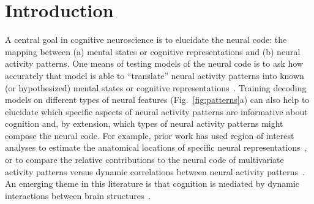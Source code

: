 \documentclass[english]{article}
\begin{document}
\section*{Introduction}
A central goal in cognitive neuroscience is to elucidate the
neural code: the mapping between (a) mental states or
cognitive representations and (b) neural activity patterns. One means
of testing models of the neural code is to ask how accurately that
model is able to ``translate'' neural activity patterns into known (or
hypothesized) mental states or cognitive
representations~\citep[e.g.,][]{HaxbEtal01, NormEtal06b, TongPrat12,
  MitcEtal08a, KamiTong05, NishEtal11, PereEtal18, HuthEtal12,
  HuthEtal16}.  Training decoding models on different types of neural
features (Fig.~\ref{fig:patterns}a) can also help to elucidate which
specific aspects of neural activity patterns are informative about
cognition and, by extension, which types of neural activity patterns
might compose the neural code.  For example, prior work has used
region of interest analyses to estimate the anatomical locations of
specific neural representations~\citep[e.g.,][]{EtzeEtal09}, or to
compare the relative contributions to the neural code of multivariate
activity patterns versus dynamic correlations between neural activity
patterns~\citep[e.g.,][]{MannEtal18, FongEtal19}.  An emerging theme
in this literature is that cognition is mediated by dynamic
interactions between brain structures~\citep{Gros88, Fris00, SporHone06, BassEtal06,
  Turk13, DemeEtal19, SoloEtal19, LuriEtal18, PretEtal17, ZouEtal19,
  MackEtal17, BresKels01, McIn00}.
\end{document}
